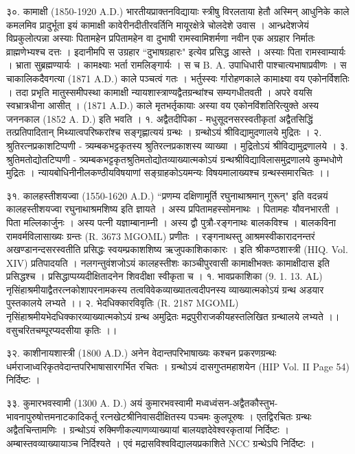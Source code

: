 ३०. कामाक्षी (1850-1920 A.D.)
भारतीयप्राक्तनविद्यायाः स्त्रीषु विरलताया हेतौ अस्मिन् आधुनिके काले कमलमिव प्रादुर्भूता इयं कामाक्षी कावेरीनदीतीरवर्तिनि मायूरक्षेत्रे चोलदेशे उवास । आन्ध्रदेशजेयं विप्रकुलोत्पन्ना अस्याः पितामहेन प्रपितामहेन वा दुभाषी रामस्वामिशर्मणा नवीन एक अग्रहार निर्मातः व्राह्मणेभ्यश्च दत्तः । इदानीमपि स उग्रहार ``दुभाषग्रहारः" इत्येव प्रसिद्ध आस्ते । अस्याः पिता रामस्वाम्यार्यः । भ्राता सुब्रह्मण्यार्यः ।
कामक्ष्याः भर्ता रामलिङ्गार्यः । स च B. A. उपाधिधारी पाश्चात्यभाषाप्रवीणः । स चाकालिकदैवगत्या (1871 A.D.) काले पञ्चत्वं गतः । भर्तुस्स्वः र्गारोहणकाले कामाक्ष्या वय एकोनर्विशतिः । तदा प्रभृति मातुस्समीपस्था कामाक्षी न्यायशास्त्राण्यद्वैतग्रन्थांश्च सम्यगधीतवती । अपरे वयसि स्वभ्रात्रधीना आसीत् । (1871 A.D.) काले मृतभर्तृकायाः अस्या वय एकोनविंशतिरित्युक्ते अस्य जननकाल (1852 A. D.) इति भवति ।
१. अद्वैतदीपिका - मधुसूदनसरस्वतीकृतां अद्वैतसिद्धिं तत्प्रतिपादितान् मिथ्यात्वपरिष्करांश्च सङ्गृह्णात्ययं ग्रन्थः । ग्रन्थोऽयं श्रीविद्यामुदणालये मुद्रितः ।
२. श्रुतिरत्नप्रकाशटिप्पणी - त्र्यम्बकभट्टकृतस्य श्रुतिरत्नप्रकाशस्य व्याख्या । मुद्रितोऽयं श्रीविद्यामुद्रणालये ।
३. श्रुतिमतोद्योतटिप्पणी - त्र्यम्बकभट्टकृतश्रुतिमतोद्योतव्याख्यात्मकोऽयं ग्रन्थश्रीविद्याविलासमुद्रणालये कुम्भधोणे मुद्रितः ।
न्यायबोधिनीनीलकण्ठीयविषयाणां सङ्ग्राहकोऽयमन्यः विषयमालाख्यश्च ग्रन्थस्समारचितः ।।

३१. कालहस्तीशयज्वा (1550-1620 A.D.)
``प्रणम्य दक्षिणामूर्ति रघुनाथाश्रमान् गुरून्" इति वदन्नयं कालहस्तीशयज्वा रघुनाथाश्रमशिष्य इति ज्ञायते । अस्य प्रपितामहस्सोमनाथः । पितामहः यौवनभारती । पिता मल्लिकार्जुनः । अस्य पत्नी यज्ञाम्बानाम्नी । अस्य द्वौ पुत्रौ-रङ्गनाथः बालकविश्च । बालकविना रामवर्मविलासाख्यः ग्रन्तः (R. 3673 MGOML) प्रणीतः । रङ्गनाथस्तु आश्रमस्वीकारादनन्तरं अखण्डानन्दसरस्वतीति प्रसिद्धः स्वयम्प्रकाशशिष्य ऋजुपकाशिकाकारः । इति श्रीकण्ठशास्त्री (HIQ. Vol. XIV) प्रतिपादयति । नलगन्तुवंशजोऽयं कालहस्तीशः काञ्चीपुरवासी कामाक्षीभक्तः कामाक्षीदास इति प्रसिद्धश्च । प्रसिद्धाप्पय्यदीक्षितादनेन शिवदीक्षा स्वीकृता च ।
१. भावप्रकाशिका (9. 1. 13. AL)
नृसिंहाश्रमीयाद्वैतरत्नकोशापरनामकस्य तत्वविवेकव्याख्यातत्वदीपनस्य व्याख्यात्मकोऽयं ग्रन्थ अडयार पुस्तकालये लभ्यते ।।
२. भेदधिक्कारविवृतिः (R. 2187 MGOML)
नृसिंहाश्रमीयभेदधिक्कारव्याख्यात्मकोऽयं ग्रन्थ अमुद्रितः मद्रपुरीराजकीयहस्तलिखित ग्रन्थालये लभ्यते ।। वसुचरितचम्पूरप्यदसीया कृतिः ।।

३२. काशीनायशास्त्री (1800 A.D.)
अनेन वेदान्तपरिभाषाख्यः कश्चन प्रकरणग्रन्थः धर्मराजाध्वरिकृतवेदान्तपरिभाषासारगर्भित रचितः । ग्रन्थोऽयं दासगुप्तमहाशयेन (HIP Vol. II Page 54) निर्दिष्टः ।

३३. कुमारभवस्वामी (1300 A. D.)
अयं कुमारभवस्वामी मध्वध्वंसन-अद्वैतकौस्तुभ-भावनापुरुषोत्तमनाटकादिकर्तू रत्नखेटश्रीनिवासदीक्षितस्य पञ्चमः कुलपूरुषः । एतद्विरचितः ग्रन्थः अद्वैतचिन्तामणिः । ग्रन्थोऽयं रुक्मिणीकल्याणव्याख्यायां बालयज्ञदेवेश्वरकृतायां निर्दिष्टः । अम्बास्तवव्याख्यायाञ्च निर्दिश्यते । एवं मद्रासविश्वविद्यालयप्रकाशिते NCC ग्रन्थेऽपि निर्दिष्टः ।

